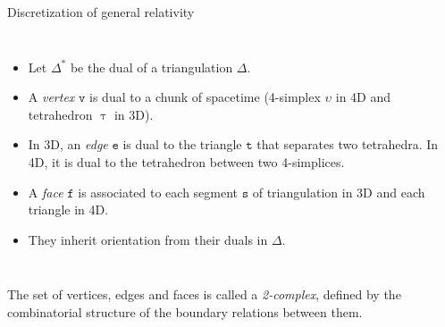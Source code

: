 \documentclass{beamer}
\newcommand\italictext[1]{\textcolor{italics}{\textit{#1}}}
\begin{document}
\begin{frame}{Discretization of general relativity}
\begin{list}{\maltese}{\leftmargin=1em \itemindent=0em}
\begin{minipage}{\linewidth}
\begin{columns}
{\begin{itemize}{\leftmargin=0em \itemindent=0em}
                    \item<3-> Let $\Delta^\text{*}$ be the dual of a triangulation $\Delta$.
                    \item<4-> A \italictext{vertex} $\mathtt{v}$ is dual to a chunk of spacetime (4-simplex $\upsilon$ in 4D and tetrahedron $\uptau$ in 3D).
                    \item<5-> In 3D, an \italictext{edge} $\mathtt{e}$ is dual to the triangle $\mathtt{t}$ that separates two tetrahedra. In 4D, it is dual to the tetrahedron between two 4-simplices.
                    \item<6-> A \italictext{face} $\mathtt{f}$ is associated to each segment $\mathtt{s}$ of triangulation in 3D and each triangle in 4D.
                    \item<7-> They inherit orientation from their duals in $\Delta$.
                \end{itemize}}
            \end{columns}
        \end{minipage}
        \item<8-> The set of vertices, edges and faces is called a \italictext{2-complex}, defined by the combinatorial structure of the boundary relations between them.
    \end{list}
\end{frame}
\end{document}
